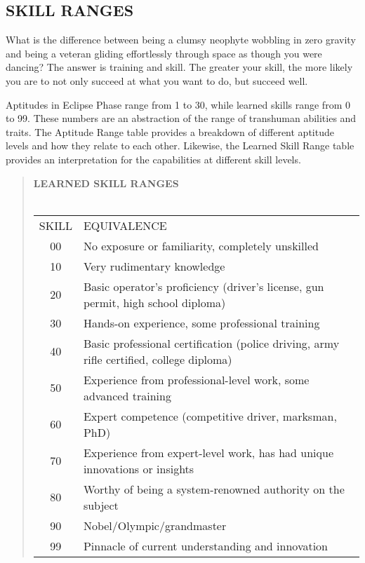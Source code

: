 \subsection{SKILL RANGES} What is the difference between being a clumsy neophyte wobbling in zero gravity and being a veteran gliding effortlessly through space as though you were dancing? The answer is training and skill. The greater your skill, the more likely you are to not only succeed at what you want to do, but succeed well. 

Aptitudes in Eclipse Phase range from 1 to 30, while learned skills range from 0 to 99. These numbers are an abstraction of the range of transhuman abilities and traits. The Aptitude Range table provides a breakdown of different aptitude levels and how they relate to each other. Likewise, the Learned Skill Range table provides an interpretation for the capabilities at different skill levels. 



\begin{quotation} \textbf{LEARNED SKILL RANGES} \\ \\ \begin{tabular}{cl} SKILL &EQUIVALENCE \\ 00 &No exposure or familiarity, completely unskilled \\ 10 &Very rudimentary knowledge \\ 20 &Basic operator’s proficiency (driver’s license, gun permit, high school diploma) \\ 30 &Hands-on experience, some professional training \\ 40 &Basic professional certification (police driving, army rifle certified, college diploma) \\ 50 &Experience from professional-level work, some advanced training \\ 60 &Expert competence (competitive driver, marksman, PhD) \\ 70 &Experience from expert-level work, has had unique innovations or insights \\ 80 &Worthy of being a system-renowned authority on the subject \\ 90 &Nobel/Olympic/grandmaster \\ 99 &Pinnacle of current understanding and innovation \\ \end{tabular} \end{quotation} 





